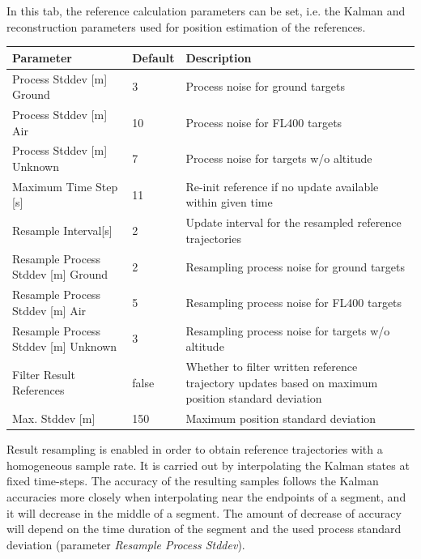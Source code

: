 In this tab, the reference calculation parameters can be set, i.e. the Kalman and reconstruction parameters used for position estimation of the references. \\

\begin{table}[H]
  \center
  \begin{tabularx}{\textwidth}{ | l | l | X |}
    \hline
    \textbf{Parameter} & \textbf{Default} &  \textbf{Description} \\ \hline
    Process Stddev [m] Ground & 3 & Process noise for ground targets \\ \hline
    Process Stddev [m] Air & 10 & Process noise for FL400 targets \\ \hline
    Process Stddev [m] Unknown & 7 & Process noise for targets w/o altitude \\ \hline
    Maximum Time Step [s] & 11 & Re-init reference if no update available within given time \\ \hline
    Resample Interval[s] & 2 & Update interval for the resampled reference trajectories \\ \hline
    Resample Process Stddev [m] Ground & 2 & Resampling process noise for ground targets \\ \hline
    Resample Process Stddev [m] Air & 5 & Resampling process noise for FL400 targets \\ \hline
    Resample Process Stddev [m] Unknown & 3 & Resampling process noise for targets w/o altitude \\ \hline    
    Filter Result References& false & Whether to filter written reference trajectory updates based on maximum position standard deviation \\ \hline
    Max. Stddev [m] & 150 & Maximum position standard deviation \\ \hline
  \end{tabularx}
\end{table}

Result resampling is enabled in order to obtain reference trajectories with a homogeneous sample rate. 
It is carried out by interpolating the Kalman states at fixed time-steps. The accuracy of the resulting samples
follows the Kalman accuracies more closely when interpolating near the endpoints of a segment, and it will decrease
in the middle of a segment. The amount of decrease of accuracy will depend on the time duration of the segment and the used 
process standard deviation (parameter \textit{Resample Process Stddev}).

